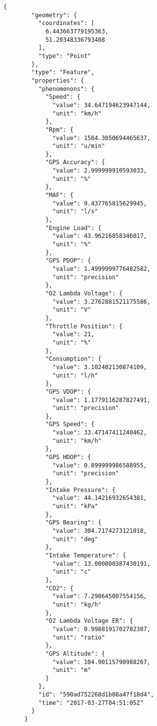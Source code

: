 \documentclass[10pt, conference]{IEEEtran}
\begin{document}
\begin{itemize}
\begin{lstlisting}
{
        "geometry": {
          "coordinates": [
            6.443663779195363,
            51.20348336793408
          ],
          "type": "Point"
        },
        "type": "Feature",
        "properties": {
          "phenomenons": {
            "Speed": {
              "value": 34.647194623947144,
              "unit": "km/h"
            },
            "Rpm": {
              "value": 1584.3050694465637,
              "unit": "u/min"
            },
            "GPS Accuracy": {
              "value": 2.999999910593033,
              "unit": "%"
            },
            "MAF": {
              "value": 9.437765815629945,
              "unit": "l/s"
            },
            "Engine Load": {
              "value": 43.96216858346017,
              "unit": "%"
            },
            "GPS PDOP": {
              "value": 1.4999999776482582,
              "unit": "precision"
            },
            "O2 Lambda Voltage": {
              "value": 3.2762881521175586,
              "unit": "V"
            },
            "Throttle Position": {
              "value": 21,
              "unit": "%"
            },
            "Consumption": {
              "value": 3.102402130874109,
              "unit": "l/h"
            },
            "GPS VDOP": {
              "value": 1.1779116287827491,
              "unit": "precision"
            },
            "GPS Speed": {
              "value": 33.47147411240462,
              "unit": "km/h"
            },
            "GPS HDOP": {
              "value": 0.899999986588955,
              "unit": "precision"
            },
            "Intake Pressure": {
              "value": 44.14216932654381,
              "unit": "kPa"
            },
            "GPS Bearing": {
              "value": 304.7174273121018,
              "unit": "deg"
            },
            "Intake Temperature": {
              "value": 13.000000387430191,
              "unit": "c"
            },
            "CO2": {
              "value": 7.290645007554156,
              "unit": "kg/h"
            },
            "O2 Lambda Voltage ER": {
              "value": 0.9988191702782387,
              "unit": "ratio"
            },
            "GPS Altitude": {
              "value": 104.90115790988267,
              "unit": "m"
            }
          },
          "id": "590ad752268d1b08a47f18d4",
          "time": "2017-03-27T04:51:05Z"
        }
      }
\end{lstlisting}



\end{itemize}
\end{document}
